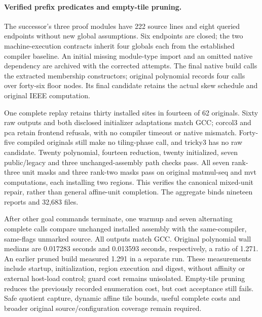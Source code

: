 \paragraph{Verified prefix predicates and empty-tile pruning.}
The successor's three proof modules have 222 source lines and eight queried
endpoints without new global assumptions. Six endpoints are closed; the two
machine-execution contracts inherit four globals each from the established
compiler baseline. An initial missing module-type import and an omitted native
dependency are archived with the corrected attempts. The final native build
calls the extracted membership constructors; original polynomial records four
calls over forty-six floor nodes. Its final candidate retains the actual skew
schedule and original IEEE computation.

One complete replay retains thirty installed sites in fourteen of 62 originals.
Sixty raw outputs and both disclosed initializer adaptations match GCC;
corcol3 and pca retain frontend refusals, with no compiler timeout or native
mismatch. Forty-five compiled originals still make no tiling-phase call, and
tricky3 has no raw candidate. Twenty polynomial, fourteen reduction, twenty
initialized, seven public/legacy and three unchanged-assembly path checks pass.
All seven rank-three unit masks and three rank-two masks pass on original
matmul-seq and mvt computations, each installing two regions. This verifies the
canonical mixed-unit repair, rather than general affine-unit completion.
The aggregate binds nineteen reports and 32,683 files.

After other goal commands terminate, one warmup and seven alternating complete
calls compare unchanged installed assembly with the same-compiler, same-flags
unmarked source. All outputs match GCC. Original polynomial wall medians are
0.017283 seconds and 0.013593 seconds, respectively, a ratio of 1.271.
An earlier pruned build measured 1.291 in a separate run. These measurements
include startup, initialization, region execution and digest, without affinity
or external host-load control; guard cost remains unisolated. Empty-tile pruning
reduces the previously recorded enumeration cost, but cost acceptance still
fails. Safe quotient capture, dynamic affine tile bounds, useful complete costs
and broader original source/configuration coverage remain required.

